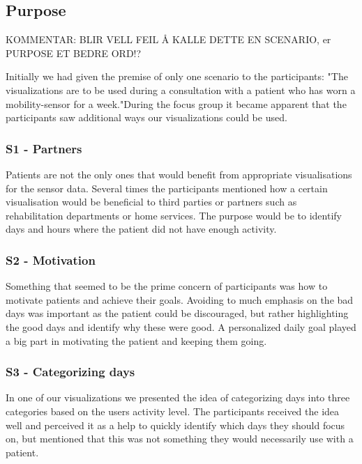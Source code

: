 \subsection{Purpose}
KOMMENTAR: BLIR VELL FEIL Å KALLE DETTE EN SCENARIO, er PURPOSE ET BEDRE ORD!?

Initially we had given the premise of only one scenario to the participants: "The visualizations are to be used during a consultation with a patient who has worn a mobility-sensor for a week."During the focus group it became apparent that the participants saw additional ways our visualizations could be used.

\subsubsection*{S1 - Partners}
Patients are not the only ones that would benefit from appropriate visualisations for the sensor data. Several times the participants mentioned how a certain visualisation would be beneficial to third parties or partners such as rehabilitation departments or home services. The purpose would be to identify days and hours where the patient did not have enough activity. %

\subsubsection*{S2 - Motivation}
Something that seemed to be the prime concern of participants was how to motivate patients and achieve their goals. Avoiding to much emphasis on the bad days was important as the patient could be discouraged, but rather highlighting the good days and identify why these were good. A personalized daily goal played a big part in motivating the patient and keeping them going. %

\subsubsection*{S3 - Categorizing days}
In one of our visualizations we presented the idea of categorizing days into three categories based on the users activity level. The participants received the idea well and perceived it as a help to quickly identify which days they should focus on, but mentioned that this was not something they would necessarily use with a patient. 

